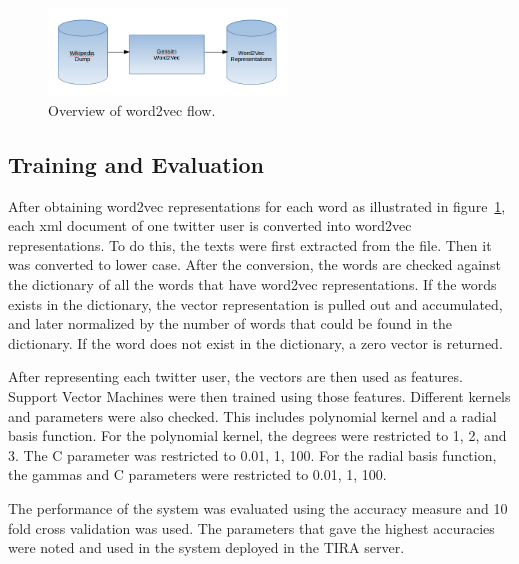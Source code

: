 \documentclass[conference]{IEEEtran}
\begin{document}
\begin{figure}
\centering
\includegraphics[width=2.5in]{Word2Vec.png}
\caption{Overview of word2vec flow.}
\label{W2vFlow}

\end{figure}


\subsection{Training and Evaluation}
After obtaining word2vec representations for each word as illustrated in figure~\ref{W2vFlow}, each xml document of one twitter user is converted into word2vec representations. To do this, the texts were first extracted from the file. Then it was converted to lower case. After the conversion, the words are checked against the dictionary of all the words that have word2vec representations. If the words exists in the dictionary, the vector representation is pulled out and accumulated, and later normalized by the number of words that could be found in the dictionary. If the word does not exist in the dictionary, a zero vector is returned. 

After representing each twitter user, the vectors are then used as features. Support Vector Machines were then trained using those features. Different kernels and parameters were also checked. This includes polynomial kernel and a radial basis function. For the polynomial kernel, the degrees were restricted to 1, 2, and 3. The C parameter was restricted to 0.01, 1, 100. For the radial basis function, the gammas and C parameters were restricted to 0.01, 1, 100.

The performance of the system was evaluated using the accuracy measure and 10 fold cross validation was used. The parameters that gave the highest accuracies were noted and used in the system deployed in the TIRA server. 
\end{document}
